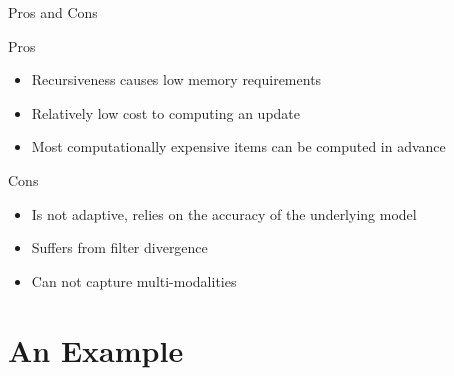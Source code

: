 \documentclass{beamer}
\begin{document}
\begin{frame}{Pros and Cons}
  \begin{box}{Pros}
    \begin{itemize}
   \pause  
    \item Recursiveness causes low memory requirements
   \pause  
    \item Relatively low cost to computing an update
   \pause  
    \item Most computationally expensive items can be computed in advance

    \end{itemize}
  \end{box}
\pause
  \begin{box}{Cons}
    \begin{itemize}
\pause
    \item  Is not adaptive, relies on the accuracy of the underlying model
\pause

  \item  Suffers from filter divergence

  \pause 

    \item  Can not capture multi-modalities
    \end{itemize}

  \end{box}
\end{frame}
  

\section{An Example}
\end{document}
